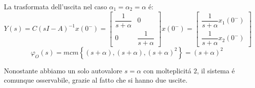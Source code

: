 \documentclass[../main.tex]{subfiles}
\begin{document}
\begin{mdframed}[style=Exercise]
\begin{Exercise}[title={Studiare l'osservabilit\'a di due vasche in parallelo}]
					La trasformata dell'uscita nel caso $ \alpha_1 = \alpha_2 = \alpha $ \'e:
					\[
						Y(s) = C(sI-A)^{-1} x(0^{-}) =
						\begin{bmatrix}
							\dfrac{1}{s+\alpha} & 0\\
							0 & \dfrac{1}{s+\alpha}
						\end{bmatrix} x(0^{-}) =
						\begin{bmatrix}
							\dfrac{1}{s+\alpha} x_1(0^{-})
							\\[1em]
							\dfrac{1}{s+\alpha} x_2(0^{-})
						\end{bmatrix}
					\]
					\[
						\varphi_O(s) = mcm\left\lbrace (s+\alpha), (s+\alpha), (s+\alpha)^2 \right\rbrace = (s+\alpha)^2
					\]
					
					Nonostante abbiamo un solo autovalore $ s = \alpha $ con molteplicit\'a $ 2 $, il sistema \'e comunque osservabile, grazie al fatto che si hanno due uscite.
			\end{Exercise}
		\end{mdframed}
\end{document}
